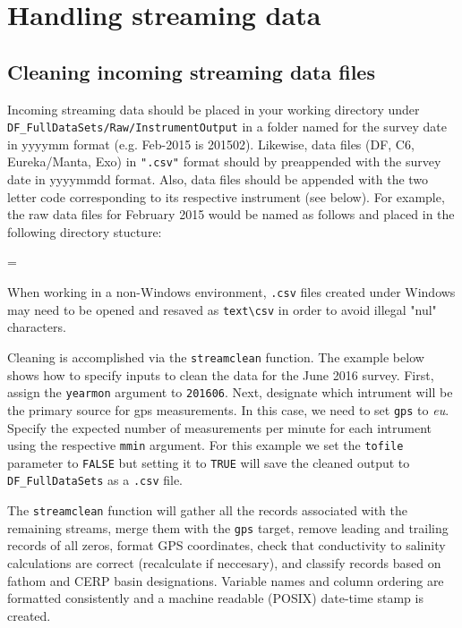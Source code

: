 \documentclass[12pt]{article}
\newenvironment{warning}
{\par\begin{mdframed}[linewidth=2pt,linecolor=red]
\begin{list}{}{\leftmargin=1cm
  \labelwidth=\leftmargin}\item[\Large\ding{43}]}
{\end{list}\end{mdframed}\par}
\begin{document}
\section{Handling streaming data}
\subsection{Cleaning incoming streaming data files}

Incoming streaming data should be placed in your working directory under \\ \verb|DF_FullDataSets|\texttt{/Raw/InstrumentOutput} in a folder named for the survey date in yyyymm format (e.g. Feb-2015 is 201502). Likewise, data files (DF, C6, Eureka/Manta, Exo) in \texttt{".csv"} format should by preappended with the survey date in yyyymmdd format. Also, data files should be appended with the two letter code corresponding to its respective instrument (see below). For example, the raw data files for February 2015 would be named as follows and placed in the following directory stucture:


\begin{warning}
When working in a non-Windows environment, \texttt{.csv} files created under Windows may need to be opened and resaved as \texttt{text}\verb|\csv| in order to avoid illegal "nul" characters.
\end{warning}

\vspace{15pt}
Cleaning is accomplished via the \nohyphens{\texttt{streamclean}} function. The example below shows how to specify inputs to clean the data for the June 2016 survey. First, assign the \texttt{yearmon} argument to \texttt{201606}. Next, designate which intrument will be the primary source for gps measurements. In this case, we need to set \texttt{gps} to \textit{eu}. Specify the expected number of measurements per minute for each intrument using the respective \texttt{mmin} argument. For this example we set the \texttt{tofile} parameter to \texttt{FALSE} but setting it to \texttt{TRUE} will save the cleaned output to \verb|DF_FullDataSets| as a \texttt{.csv} file. 

The \texttt{streamclean} function will gather all the records associated with the remaining streams, merge them with the \texttt{gps} target, remove leading and trailing records of all zeros, format GPS coordinates, check that conductivity to salinity calculations are correct (recalculate if neccesary), and classify records based on fathom and CERP basin designations. Variable names and column ordering are formatted consistently and a machine readable (POSIX) date-time stamp is created.   
\end{document}
